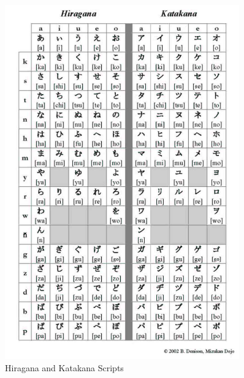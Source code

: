 \begin{figure}[ht]
    \centering
    \includegraphics[width=0.9\textwidth]{ApeB/HiraKata}
    \caption{Hiragana and Katakana Scripts}
    \label{fig:hirakata}
\end{figure}